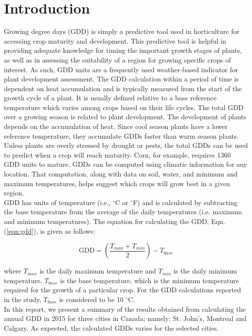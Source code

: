 \documentclass{article}
\begin{document}
\section{ \bf Introduction}
Growing degree days (GDD) is simply a predictive tool used in horticulture for accessing crop maturity and development. This predictive tool is helpful in providing adequate knowledge for timing the important growth stages of plants, as well as in assessing the suitability of a region for growing specific crops of interest. As such, GDD units are a frequently used weather-based indicator for plant development assessment. The GDD calculation within a period of time is dependent on heat accumulation and is typically measured from the start of the growth cycle of a plant. It is usually defined relative to a base reference temperature which varies among crops based on their life cycles. The total GDD over a growing season is related to plant development. The development of plants depends on the accumulation of heat. Since cool season plants have a lower reference temperature, they accumulate GDDs faster than warm season plants. Unless plants are overly stressed by drought or pests, the total GDDs can be used to predict when a crop will reach maturity. Corn, for example, requires 1360 GDD units to mature. GDDs can be computed using climatic information for any location. That computation, along with data on soil, water, and minimum and maximum temperatures, helps suggest which crops will grow best in a given region.\\ [\baselineskip] GDD has units of temperature (i.e., $^{\circ}$C or $^{\circ}$F) and is calculated by subtracting the base temperature from the average of the daily temperatures (i.e. maximum and minimum temperatures). The equation for calculating the GDD, Eqn.(\ref{eqn:gdd}), is given as follows:

\begin{equation}
\textrm{GDD} = \left(\frac{T_{max} + T_{min}}{2}\right) - T_{base}
\label{eqn:gdd}
\end{equation}

\noindent where {$T_{max}$} is the daily maximum temperature and {$T_{min}$} is the daily minimum temperature. {$T_{base}$} is the base temperature, which is the minimum temperature required for the growth of a particular crop. For the GDD calculations reported in the study, {$T_{base}$} is considered to be 10 $^{\circ}$C.\\
In this report, we present a summary of the results obtained from calculating the annual GDD in 2015 for three cities in Canada; namely: St. John's, Montreal and Calgary. As expected, the calculated GDDs varies for the selected cities. 
\end{document}
